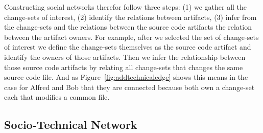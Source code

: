 Constructing social networks therefor follow three steps: (1) we gather all the change-sets of interest, (2) identify the relations between artifacts, (3) infer from the change-sets and the relations between the source code artifacts the relation between the artifact owners.
For example, after we selected the set of change-sets of interest we define the change-sets themselves as the source code artifact and identify the owners of those artifacts.
Then we infer the relationship between those source code artifacts by relating all change-sets that changes the same source code file.
And as Figure~\ref{fig:addtechnicaledge} shows this means in the case for Alfred and Bob that they are connected because both own a change-set each that modifies a common file.

\subsection{Socio-Technical Network}
